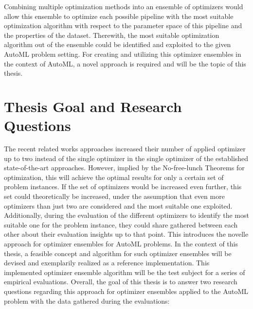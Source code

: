 Combining multiple optimization methods into an ensemble of optimizers would allow this ensemble to optimize each possible pipeline with the most suitable optimization algorithm with respect to the parameter space of this pipeline and the properties of the dataset.
Therewith, the most suitable optimization algorithm out of the ensemble could be identified and exploited to the given AutoML problem setting.\newline
For creating and utilizing this optimizer ensembles in the context of AutoML, a novel approach is required and will be the topic of this thesis. 

\section{Thesis Goal and Research Questions}
\label{sec:intro:goal}
The recent related works approaches increased their number of applied optimizer up to two instead of the single optimizer in the single optimizer of the established state-of-the-art approaches.
However, implied by the No-free-lunch Theorems for optimization, this will achieve the optimal results for only a certain set of problem instances.
If the set of optimizers would be increased even further, this set could theoretically be increased, under the assumption that even more optimizers than just two are considered and the most suitable one exploited.
Additionally, during the evaluation of the different optimizers to identify the most suitable one for the problem instance, they could share gathered between each other about their evaluation insights up to that point.
This introduces the novelle approach for optimizer ensembles for AutoML problems.\newline
In the context of this thesis, a feasible concept and algorithm for such optimizer ensembles will be devised and exemplarily realized as a reference implementation.
This  implemented optimizer ensemble algorithm will be the test subject for a series of empirical evaluations.\newline
Overall, the goal of this thesis is to answer two research questions regarding this approach for optimizer ensembles applied to the AutoML problem with the data gathered during the evaluations:
